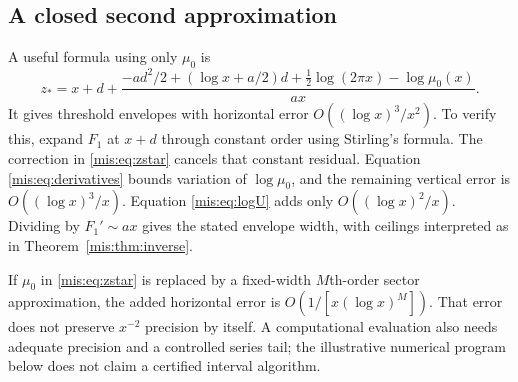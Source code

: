 \documentclass[11pt]{article}
\theoremstyle{remark}\newtheorem{remark}[theorem]{Remark}
\begin{document}
\subsection{A closed second approximation}
A useful formula using only $\mu_0$ is
\begin{equation}\label{mis:eq:zstar}
 z_*=x+d+
 \frac{-ad^2/2+(\log x+a/2)d+\tfrac12\log(2\pi x)-\log\mu_0(x)}{ax}.
\end{equation}
It gives threshold envelopes with horizontal error $O((\log x)^3/x^2)$. To verify this, expand $F_1$ at $x+d$ through constant order using Stirling's formula. The correction in \eqref{mis:eq:zstar} cancels that constant residual. Equation \eqref{mis:eq:derivatives} bounds variation of $\log\mu_0$, and the remaining vertical error is $O((\log x)^3/x)$. Equation \eqref{mis:eq:logU} adds only $O((\log x)^2/x)$. Dividing by $F_1'\sim ax$ gives the stated envelope width, with ceilings interpreted as in Theorem~\ref{mis:thm:inverse}.

If $\mu_0$ in \eqref{mis:eq:zstar} is replaced by a fixed-width $M$th-order sector approximation, the added horizontal error is $O(1/[x(\log x)^M])$. That error does not preserve $x^{-2}$ precision by itself. A computational evaluation also needs adequate precision and a controlled series tail; the illustrative numerical program below does not claim a certified interval algorithm.
\end{document}
